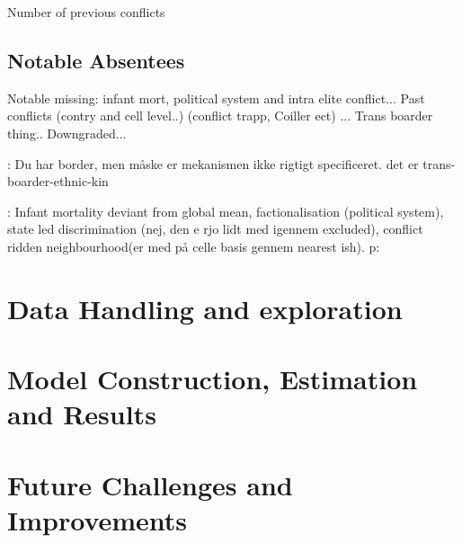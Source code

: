 \documentclass[a4paper]{article}
\begin{document}





\cite{Cederman_Gleditsch_Buhaug_2013} Number of previous conflicts



\subsection{Notable Absentees}\label{notable_absentees} %

Notable missing: infant mort, political system and intra elite conflict... \citep{Goldstone_2010} Past conflicts (contry and cell level..) (conflict trapp, Coiller ect) ... Trans boarder thing.. Downgraded... \citep{Cederman_Gleditsch_Buhaug_2013}

\cite[119-142]{Cederman_Gleditsch_Buhaug_2013}: Du har border, men måske er mekanismen ikke rigtigt specificeret. det er trans-boarder-ethnic-kin

\cite{Goldstone_2010} : Infant mortality deviant from global mean, factionalisation (political system), state led discrimination (nej, den e rjo lidt med igennem excluded), conflict ridden neighbourhood(er med på celle basis gennem nearest ish). p: 


\section{Data Handling and exploration}


\section{Model Construction, Estimation and Results}


\section{Future Challenges and Improvements}
\end{document}
